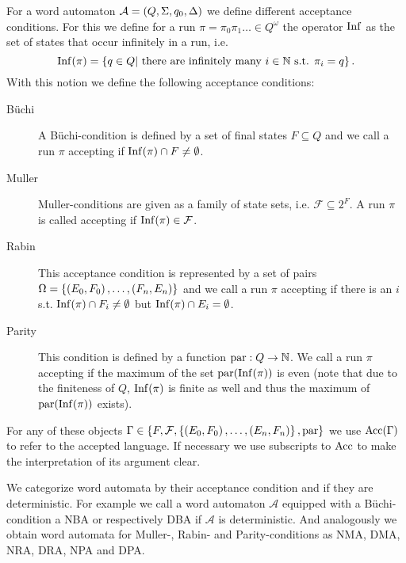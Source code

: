 \begin{definition}
  For a word automaton $\mathcal{A} = \left(Q, \Sigma, q_{0}, \Delta\right)$ we
  define different acceptance conditions. For this we define for a run
  $\pi = \pi_{0}\pi_{1}\dots\in Q^{\omega}$ the operator
  $\operatorname{Inf}$ as the set of states that occur infinitely in a run, i.e.
  \begin{equation*}
    \operatorname{Inf}(\pi) = \left\{q\in Q\middle| \text{ there are infinitely many }
    i\in\mathbb{N} \text{ s.t. } \pi_{i} = q\right\}.
  \end{equation*}
  With this notion we define the following acceptance conditions:
  \begin{description}
    \item [Büchi] A Büchi-condition is defined by a set of final states
      $F\subseteq Q$ and we call a run $\pi$ accepting if
      $\operatorname{Inf}(\pi)\cap F\neq\emptyset$.
    \item [Muller] Muller-conditions are given as a family of state sets, i.e.
      $\mathcal{F}\subseteq 2^{F}$. A run $\pi$ is called accepting if
      $\operatorname{Inf}(\pi)\in\mathcal{F}$.
    \item [Rabin] This acceptance condition is represented by a set of pairs\\
      $\Omega = \left\{\left(E_{0}, F_{0}\right), \dots, \left(F_{n}, E_{n}\right)\right\}$ and we
      call a run $\pi$ accepting if there is an $i$ s.t.
      $\operatorname{Inf}(\pi)\cap F_{i}\neq\emptyset$ but $\operatorname{Inf}(\pi)\cap E_{i} = \emptyset$.
    \item [Parity] This condition is defined by a function
      $\operatorname{par}:Q\rightarrow \mathbb{N}$. We call a run $\pi$ accepting if the
      maximum of the set $\operatorname{par}(\operatorname{Inf}(\pi))$ is even (note that due to the 
      finiteness of $Q$, $\operatorname{Inf}(\pi)$ is finite as well and thus the maximum of 
      $\operatorname{par}(\operatorname{Inf}(\pi))$ exists).
  \end{description}
  For any of these objects $\Gamma\in\left\{F, \mathcal{F}, \left\{\left(E_{0},
  F_{0}\right),\dots,\left(E_{n}, F_{n}\right)\right\}, \operatorname{par}\right\}$ we use $\operatorname{Acc}(\Gamma)$ to refer
  to the accepted language. If necessary we use subscripts to $\operatorname{Acc}$ to make 
  the interpretation of its argument clear.
\end{definition}
We categorize word automata by their acceptance condition and if
they are deterministic. For example we call a word automaton $\mathcal{A}$
equipped with a Büchi-condition a \ac{NBA} or respectively \ac{DBA} if
$\mathcal{A}$ is deterministic. And analogously we obtain word automata for
Muller-, Rabin- and Parity-conditions as \ac{NMA}, \ac{DMA}, \ac{NRA},
\ac{DRA}, \ac{NPA} and \ac{DPA}.

